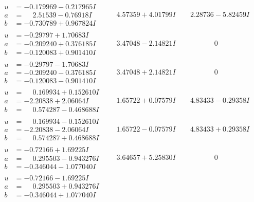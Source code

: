 \documentclass[1p]{elsarticle_modified}
\theoremstyle{definition}
\begin{document}
$$\begin{array}{c|c|c}
\begin{aligned}
u &= -0.179969 - 0.217965 I \\
a &= \phantom{-}2.51539 - 0.76918 I \\
b &= -0.730789 + 0.967824 I\end{aligned}
 & \phantom{-}4.57359 + 4.01799 I & \phantom{-}2.28736 - 5.82459 I \\ \hline\begin{aligned}
u &= -0.29797 + 1.70683 I \\
a &= -0.209240 + 0.376185 I \\
b &= -0.120083 + 0.901410 I\end{aligned}
 & \phantom{-}3.47048 - 2.14821 I & \phantom{-0.000000 } 0 \\ \hline\begin{aligned}
u &= -0.29797 - 1.70683 I \\
a &= -0.209240 - 0.376185 I \\
b &= -0.120083 - 0.901410 I\end{aligned}
 & \phantom{-}3.47048 + 2.14821 I & \phantom{-0.000000 } 0 \\ \hline\begin{aligned}
u &= \phantom{-}0.169934 + 0.152610 I \\
a &= -2.20838 + 2.06064 I \\
b &= \phantom{-}0.574287 - 0.468688 I\end{aligned}
 & \phantom{-}1.65722 + 0.07579 I & \phantom{-}4.83433 - 0.29358 I \\ \hline\begin{aligned}
u &= \phantom{-}0.169934 - 0.152610 I \\
a &= -2.20838 - 2.06064 I \\
b &= \phantom{-}0.574287 + 0.468688 I\end{aligned}
 & \phantom{-}1.65722 - 0.07579 I & \phantom{-}4.83433 + 0.29358 I \\ \hline\begin{aligned}
u &= -0.72166 + 1.69225 I \\
a &= \phantom{-}0.295503 - 0.943276 I \\
b &= -0.346044 - 1.077040 I\end{aligned}
 & \phantom{-}3.64657 + 5.25830 I & \phantom{-0.000000 } 0 \\ \hline\begin{aligned}
u &= -0.72166 - 1.69225 I \\
a &= \phantom{-}0.295503 + 0.943276 I \\
b &= -0.346044 + 1.077040 I\end{aligned}

\end{array}$$
\end{document}
